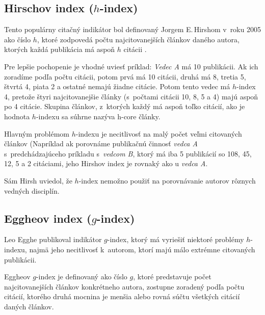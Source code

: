 \subsection{Hirschov index ($h$-index)}
\label{sec:h-index}

Tento populárny citačný indikátor bol definovaný Jorgem E.\,Hirshom v~roku 2005
ako číslo $h$, ktoré zodpovedá počtu najcitovanejších článkov daného autora,
ktorých každá publikácia má aspoň $h$ citácii \citep{Hirsch2005}.

Pre lepšie pochopenie je vhodné uviesť príklad: \emph{Vedec A} má 10 publikácii.
Ak ich zoradíme podľa počtu citácii, potom prvá má 10 citácii, druhá má 8,
tretia 5, štvrtá 4, piata 2 a ostatné nemajú žiadne citácie.  Potom tento vedec
má $h$-index 4, pretože štyri najcitovanejšie články (s~počtami citácii 10, 8, 5
a 4) majú aspoň po 4 citácie.  Skupina článkov, z~ktorých každý má aspoň toľko
citácií, ako je hodnota $h$-indexu sa súhrne nazýva h-core články.

Hlavným problémom $h$-indexu je necitlivosť na malý počet veľmi citovaných
článkov (Napríklad ak porovnáme publikačnú činnosť \emph{vedca A}
s~predchádzajúceho príkladu s~\emph{vedcom B}, ktorý má iba 5 publikácií so 108,
45, 12, 5 a 2 citáciami, jeho Hirshov index je rovnaký ako u \emph{vedca A}.

Sám Hirsh uviedol, že $h$-index nemožno použiť na porovnávanie autorov rôznych
vedných disciplín.


\subsection{Eggheov index ($g$-index)}
\label{sec:g-index}

Leo Egghe \citeyearpar{Egghe2006} publikoval indikátor $g$-index, ktorý má
vyriešiť niektoré problémy $h$-indexu, najmä jeho necitlivosť k~autorom, ktorí
majú málo extrémne citovaných publikácii.

Eggheov $g$-index je definovaný ako číslo $g$, ktoré predstavuje počet
najcitovanejších článkov konkrétneho autora, zostupne zoradený podľa počtu
citácií, ktorého druhá mocnina je menšia alebo rovná súčtu všetkých citácií
daných článkov.

